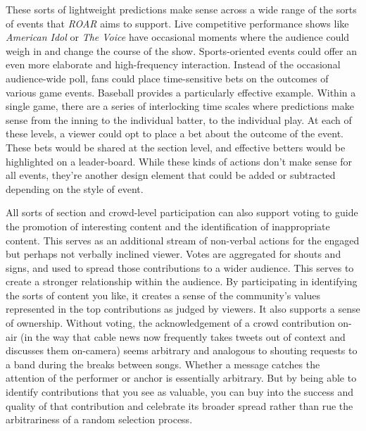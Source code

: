 These sorts of lightweight predictions make sense across a wide range of the sorts of events that \emph{ROAR} aims to support. Live competitive performance shows like \emph{American Idol} or \emph{The Voice} have occasional moments where the audience could weigh in and change the course of the show. Sports-oriented events could offer an even more elaborate and high-frequency interaction. Instead of the occasional audience-wide poll, fans could place time-sensitive bets on the outcomes of various game events. Baseball provides a particularly effective example. Within a single game, there are a series of interlocking time scales where predictions make sense from the inning to the individual batter, to the individual play. At each of these levels, a viewer could opt to place a bet about the outcome of the event. These bets would be shared at the section level, and effective betters would be highlighted on a leader-board. While these kinds of actions don't make sense for all events, they're another design element that could be added or subtracted depending on the style of event. 

All sorts of section and crowd-level participation can also support voting to guide the promotion of interesting content and the identification of inappropriate content. This serves as an additional stream of non-verbal actions for the engaged but perhaps not verbally inclined viewer. Votes are aggregated for shouts and signs, and used to spread those contributions to a wider audience. This serves to create a stronger relationship within the audience. By participating in identifying the sorts of content you like, it creates a sense of the community's values represented in the top contributions as judged by viewers. It also supports a sense of ownership. Without voting, the acknowledgement of a crowd contribution on-air (in the way that cable news now frequently takes tweets out of context and discusses them on-camera) seems arbitrary and analogous to shouting requests to a band during the breaks between songs. Whether a message catches the attention of the performer or anchor is essentially arbitrary. But by being able to identify contributions that you see as valuable, you can buy into the success and quality of that contribution and celebrate its broader spread rather than rue the arbitrariness of a random selection process.

